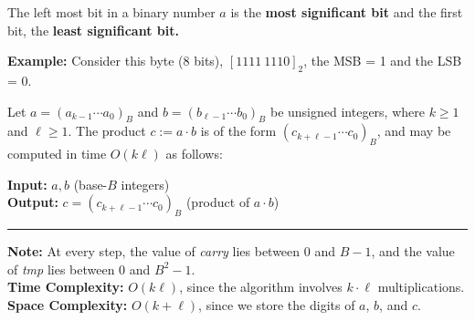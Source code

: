 \begin{Def}

    The left most bit in a binary number $a$ is the \textbf{most significant bit} and the first bit, the \textbf{least significant bit.}
\end{Def}

\noindent
\textbf{Example:} Consider this byte (8 bits), $[1111 \ 1110]_2$, the MSB = 1 and the LSB = 0.  

\newpage
\begin{Func}
    Let $a = (a_{k-1} \cdots a_0)_B$ and $b = (b_{\ell-1} \cdots b_0)_B$ be unsigned integers, where $k \geq 1$ and $\ell \geq 1$. The product $c := a \cdot b$ is of the form $(c_{k+\ell-1} \cdots c_0)_B$, and may be computed in time $O(k\ell)$ as follows:

    \vspace{.5em}
    \noindent
    \textbf{Input:} $a, b$ (base-$B$ integers)\\
    \textbf{Output:} $c = (c_{k+\ell-1} \cdots c_0)_B$ (product of $a \cdot b$)\\

    \begin{algorithm}[H]
        \SetAlgoLined
    \end{algorithm}

    \noindent\rule{\textwidth}{0.4pt}
    
    \noindent
    \textbf{Note:} At every step, the value of \textit{carry} lies between $0$ and $B-1$, and the value of \textit{tmp} lies between $0$ and $B^2 - 1$.\\
    \textbf{Time Complexity:} $O(k\ell)$, since the algorithm involves $k \cdot \ell$ multiplications.\\
    \textbf{Space Complexity:} $O(k + \ell)$, since we store the digits of $a$, $b$, and $c$.
\end{Func}

